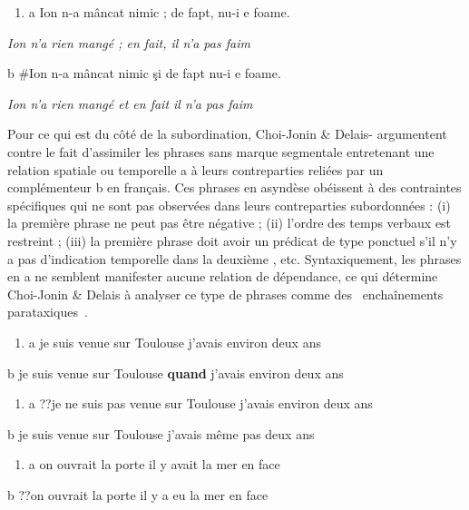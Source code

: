 \begin{enumerate}
\item \label{bkm:Ref273638711}a  Ion n-a mâncat nimic ; de fapt, nu-i e foame.


\end{enumerate}
{\itshape
  Ion n'a rien mangé ; en fait, il n'a pas faim}

  b  \#Ion n-a mâncat nimic şi de fapt nu-i e foame.

    \textit{Ion n'a rien mangé et en fait il n'a pas faim}

Pour ce qui est du côté de la subordination, Choi-Jonin \& Delais-\citet{Roussarie2006} argumentent contre le fait d'assimiler les phrases sans marque segmentale entretenant une relation spatiale ou temporelle a à leurs contreparties reliées par un complémenteur b en français. Ces phrases en asyndèse obéissent à des contraintes spécifiques qui ne sont pas observées dans leurs contreparties subordonnées : (i) la première phrase ne peut pas être négative  ; (ii) l'ordre des temps verbaux est restreint  ; (iii) la première phrase doit avoir un prédicat de type ponctuel s'il n'y a pas d'indication temporelle dans la deuxième , etc. Syntaxiquement, les phrases en a ne semblent manifester aucune relation de dépendance, ce qui détermine Choi-Jonin \& Delais \citet{Roussarie2006} à analyser ce type de phrases comme des {\guillemotleft}~enchaînements parataxiques~{\guillemotright}.


\begin{enumerate}
\item \label{bkm:Ref273720759}a  je suis venue sur Toulouse j'avais environ deux ans


\end{enumerate}
  b  je suis venue sur Toulouse \textbf{quand} j'avais environ deux ans


\begin{enumerate}
\item \label{bkm:Ref273721354}a  ??je ne suis pas venue sur Toulouse j'avais environ deux ans


\end{enumerate}
  b  je suis venue sur Toulouse j'avais même pas deux ans


\begin{enumerate}
\item \label{bkm:Ref273721371}a  on ouvrait la porte il y avait la mer en face


\end{enumerate}
  b  ??on ouvrait la porte il y a eu la mer en face

